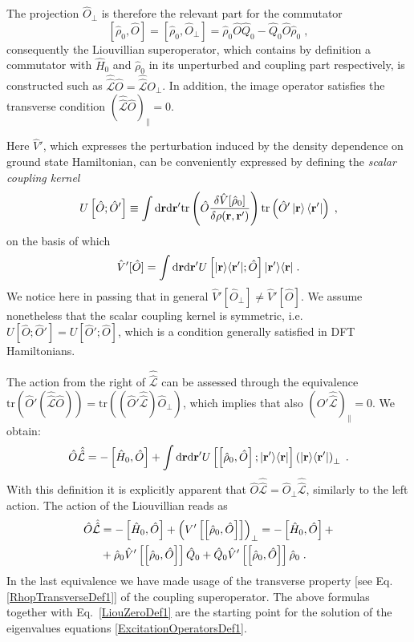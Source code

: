 \documentclass[reprint,aps,prb]{revtex4-1}
\newcommand{\dd}{{\rm d}}
\renewcommand{\r}{{\bf r}}
\newcommand{\be}{\begin{equation}}
\newcommand{\ee}{\end{equation}}
\newcommand{\nn}{\notag}
\newcommand{\lb}{\label}
\newcommand{\op}[1]{\hat {#1}}
\newcommand{\sop}[1]{\op{\op {#1}}}
\newcommand{\commutator}[2]{\left[ {#1} , {#2} \right]}
\newcommand{\trace}[1]{\mathrm{tr}\left(#1\right)}
\newcommand{\ketbra}[2]{| #1 \rangle \langle #2 |}
\newcommand{\dmnot}{\op{\rho}_0}
\newcommand{\hnot}{\op{H}_0}
\newcommand{\Liouv}{\sop{\mathcal L}}
\begin{document}
The projection $\op O_\perp$ is therefore the relevant part for the commutator
\begin{equation}
\commutator{\dmnot}{\op O} = \commutator{\dmnot}{\op O_\perp} =
\dmnot \op O \op Q_0  - \op Q_0 \op O \dmnot  \;,
\end{equation}
consequently the Liouvillian superoperator, which contains by definition a commutator with $\hnot$ and $\dmnot$ in its unperturbed and coupling part respectively,
is constructed such as $\Liouv \op O = \Liouv O_\perp$. In addition, the image operator satisfies the transverse condition
$\left( \Liouv \op O \right)_\parallel =0$.

Here $\op V'$, which expresses the perturbation induced by the density dependence on ground state Hamiltonian, can be conveniently expressed by defining the
\emph{scalar coupling kernel}
\be\lb{CouplingKernelDef1}
U\left[\op O; \op O'\right] \equiv  \int \dd \r \dd \r' \trace{\op O \frac{\delta \op V[\dmnot] }{\delta \rho(\r,\r')}
} \trace{\op O' \ket{\r} \bra{\r'}}\;,
\ee
on the basis of which
\be\lb{VpDef1}
\op V'[\op O]=
\int \dd \r \dd \r' U\left[\ketbra{\r}{\r'};\op O\right] \ketbra{\r'}{\r}\;.
\ee
We notice here in passing that in general $\op V'[\op O_\perp] \neq \op V'[\op O]$.
We assume nonetheless that the scalar coupling kernel is symmetric, i.e. $U\left[\op O; \op O'\right] = U\left[\op O'; \op O\right]$, which is a condition generally satisfied in DFT Hamiltonians.

The action from the right of $\Liouv$ can be assessed through the equivalence $\trace{\op O'(\Liouv\op O)} = \trace{(\op O'\Liouv)\op O_\perp}$, which implies that also
$\left(\op O' \Liouv\right)_\parallel =0$. We obtain:
\be
\op O\Liouv = -\commutator{\hnot}{\op O} + \int \dd\r\dd\r'
U\left[\commutator{\dmnot}{\op O};\ketbra{\r'}{\r}\right]\left(\ketbra{\r}{\r'}\right)_\perp \;. \nn
\ee
With this definition it is explicitly apparent that $\op O\Liouv=\op O_\perp \Liouv$,
similarly to the left action. The action of the Liouvillian reads as
\begin{align}\lb{LiouvillianRightActionDef1}
\op O\Liouv &= -\commutator{\hnot}{\op O} + \left(V'\left[\commutator{{\dmnot}}{\op O}\right]\right)_\perp = -\commutator{\hnot}{\op O} + \nn \\
&+ \dmnot\op V'\left[\commutator{{\dmnot}}{\op O}\right]\op Q_0 + \op Q_0\op V'\left[\commutator{\dmnot}{\op O}\right]\dmnot \;.
\end{align}
In the last equivalence we have made usage of the transverse property [see Eq. \eqref{RhopTransverseDef1}] of the coupling superoperator. The above formulas
together with Eq.~\eqref{LiouZeroDef1} are the starting point for the solution of the eigenvalues equations \eqref{ExcitationOperatorsDef1}.
\end{document}
